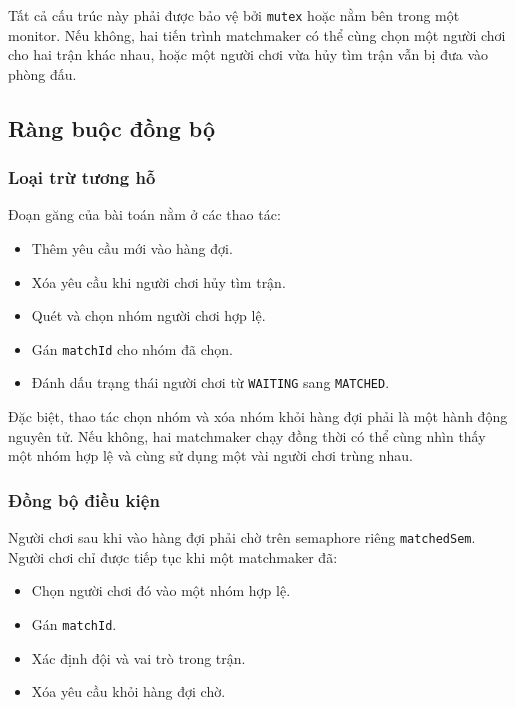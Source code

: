 Tất cả cấu trúc này phải được bảo vệ bởi \texttt{mutex} hoặc nằm bên trong một
monitor. Nếu không, hai tiến trình matchmaker có thể cùng chọn một người chơi
cho hai trận khác nhau, hoặc một người chơi vừa hủy tìm trận vẫn bị đưa vào
phòng đấu.

\subsection{Ràng buộc đồng bộ}

\subsubsection*{Loại trừ tương hỗ}

Đoạn găng của bài toán nằm ở các thao tác:

\begin{itemize}
    \item Thêm yêu cầu mới vào hàng đợi.
    \item Xóa yêu cầu khi người chơi hủy tìm trận.
    \item Quét và chọn nhóm người chơi hợp lệ.
    \item Gán \texttt{matchId} cho nhóm đã chọn.
    \item Đánh dấu trạng thái người chơi từ \texttt{WAITING} sang
    \texttt{MATCHED}.
\end{itemize}

Đặc biệt, thao tác chọn nhóm và xóa nhóm khỏi hàng đợi phải là một hành động
nguyên tử. Nếu không, hai matchmaker chạy đồng thời có thể cùng nhìn thấy một
nhóm hợp lệ và cùng sử dụng một vài người chơi trùng nhau.

\subsubsection*{Đồng bộ điều kiện}

Người chơi sau khi vào hàng đợi phải chờ trên semaphore riêng
\texttt{matchedSem}. Người chơi chỉ được tiếp tục khi một matchmaker đã:

\begin{itemize}
    \item Chọn người chơi đó vào một nhóm hợp lệ.
    \item Gán \texttt{matchId}.
    \item Xác định đội và vai trò trong trận.
    \item Xóa yêu cầu khỏi hàng đợi chờ.
\end{itemize}

